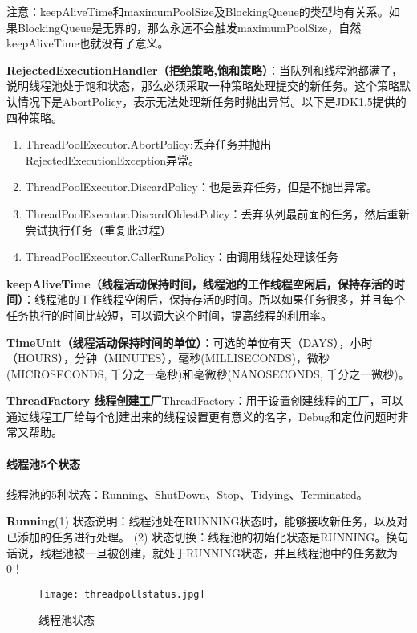 \documentclass[../../../interview-questions.tex]{subfiles}
\begin{document}
注意：keepAliveTime和maximumPoolSize及BlockingQueue的类型均有关系。如果BlockingQueue是无界的，那么永远不会触发maximumPoolSize，自然keepAliveTime也就没有了意义。


\textbf{RejectedExecutionHandler（拒绝策略,饱和策略）}：当队列和线程池都满了，说明线程池处于饱和状态，那么必须采取一种策略处理提交的新任务。这个策略默认情况下是AbortPolicy，表示无法处理新任务时抛出异常。以下是JDK1.5提供的四种策略。

\begin{enumerate}
    \item {ThreadPoolExecutor.AbortPolicy:丢弃任务并抛出RejectedExecutionException异常。}
    \item {ThreadPoolExecutor.DiscardPolicy：也是丢弃任务，但是不抛出异常。}
    \item {ThreadPoolExecutor.DiscardOldestPolicy：丢弃队列最前面的任务，然后重新尝试执行任务（重复此过程）}
    \item {ThreadPoolExecutor.CallerRunsPolicy：由调用线程处理该任务}
\end{enumerate}

\textbf{keepAliveTime（线程活动保持时间，线程池的​​工作线程空闲后​​​，​​保持存活的时间​​​）}：线程池的工作线程空闲后，保持存活的时间。所以如果任务很多，并且每个任务执行的时间比较短，可以调大这个时间，提高线程的利用率。

\textbf{TimeUnit（线程活动保持时间的单位）}：可选的单位有天（DAYS），小时（HOURS），分钟（MINUTES），毫秒(MILLISECONDS)，微秒(MICROSECONDS, 千分之一毫秒)和毫微秒(NANOSECONDS, 千分之一微秒)。

\textbf{ThreadFactory 线程创建工厂}ThreadFactory：用于设置创建线程的工厂，可以通过线程工厂给每个创建出来的线程设置更有意义的名字，Debug和定位问题时非常又帮助。

\paragraph{线程池5个状态}

线程池的5种状态：Running、ShutDown、Stop、Tidying、Terminated。

\textbf{Running}(1) 状态说明：线程池处在RUNNING状态时，能够接收新任务，以及对已添加的任务进行处理。
(2) 状态切换：线程池的初始化状态是RUNNING。换句话说，线程池被一旦被创建，就处于RUNNING状态，并且线程池中的任务数为0！

\begin{figure}[htbp]
	\centering
	\texttt{[image: threadpollstatus.jpg]}
	\caption{线程池状态}
	\label{fig:threadpollstatus}
\end{figure}
\end{document}
